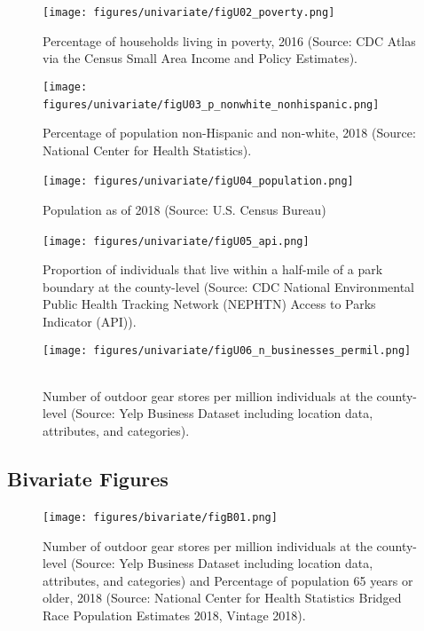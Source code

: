 \documentclass{article}
\begin{document}
\begin{figure}[!h] 
    \centering
    \caption{Percentage of households living in poverty, 2016 (Source: CDC Atlas via the Census Small Area Income and Policy Estimates).}
    \texttt{[image: figures/univariate/figU02\_poverty.png]}
    \
\end{figure}
\FloatBarrier

\begin{figure}[!h] 
    \centering
    \caption{Percentage of population non-Hispanic and non-white, 2018 (Source: National Center for Health Statistics).}
    \texttt{[image: figures/univariate/figU03\_p\_nonwhite\_nonhispanic.png]}
    \
\end{figure}
\FloatBarrier

\begin{figure}[!h] 
    \centering
    \caption{Population as of 2018 (Source: U.S. Census Bureau)}
    \texttt{[image: figures/univariate/figU04\_population.png]}
    \
\end{figure}
\FloatBarrier

\begin{figure}[!h] 
    \centering
    \caption{Proportion of individuals that live within a half-mile of a park boundary at the county-level (Source: CDC National Environmental Public Health Tracking Network (NEPHTN) Access to Parks Indicator (API)).}
    \texttt{[image: figures/univariate/figU05\_api.png]}
    \
\end{figure}
\FloatBarrier

\begin{figure}[!h] 
    \centering
    \caption{Number of outdoor gear stores per million individuals at the county-level (Source: Yelp Business Dataset including location data, attributes, and categories).}
    \texttt{[image: figures/univariate/figU06\_n\_businesses\_permil.png]}
    \
\end{figure}
\FloatBarrier

\newpage
\subsection{\textbf{Bivariate Figures}}
\begin{figure}[!h] 
    \centering
    \caption{Number of outdoor gear stores per million individuals at the county-level (Source: Yelp Business Dataset including location data, attributes, and categories) and Percentage of population 65 years or older, 2018 (Source: National Center for Health Statistics Bridged Race Population Estimates 2018, Vintage 2018). }
    \texttt{[image: figures/bivariate/figB01.png]}
    \
\end{figure}
\FloatBarrier
\end{document}
